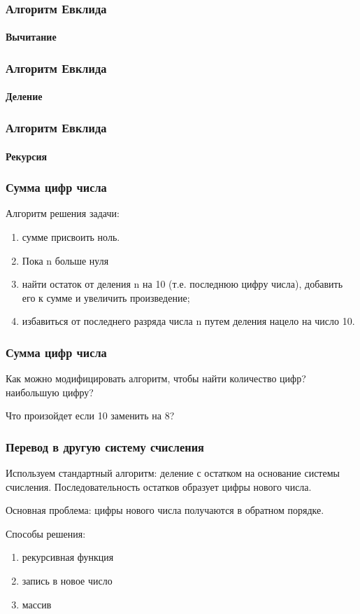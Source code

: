 \begin{frame}[fragile]
\frametitle{Алгоритм Евклида}
\framesubtitle{Вычитание}



\end{frame}

\begin{frame}[fragile]
\frametitle{Алгоритм Евклида}
\framesubtitle{Деление}



\end{frame}

\begin{frame}[fragile]
\frametitle{Алгоритм Евклида}
\framesubtitle{Рекурсия}



\end{frame}

\begin{frame}[fragile]
\frametitle{Сумма цифр числа}

Алгоритм решения задачи: 
\begin{enumerate}
\item сумме присвоить ноль.
\item Пока n больше нуля
\item найти остаток от деления n на 10 (т.е. последнюю цифру числа), добавить его к сумме и увеличить произведение;
\item избавиться от последнего разряда числа n путем деления нацело на число 10.
\end{enumerate}

    
\end{frame}

\begin{frame}[fragile]
\frametitle{Сумма цифр числа}



Как можно модифицировать алгоритм, чтобы найти количество цифр? наибольшую цифру?

Что произойдет если 10 заменить на 8?

    
\end{frame}

\begin{frame}[fragile]
\frametitle{Перевод в другую систему счисления}

Используем стандартный алгоритм: деление с остатком на основание системы счисления. Последовательность остатков образует цифры нового числа. 

Основная проблема: цифры нового числа получаются в обратном порядке.

Способы решения:
\begin{enumerate}
 \item рекурсивная функция
 \item запись в новое число
 \item массив
\end{enumerate}
    
\end{frame}

